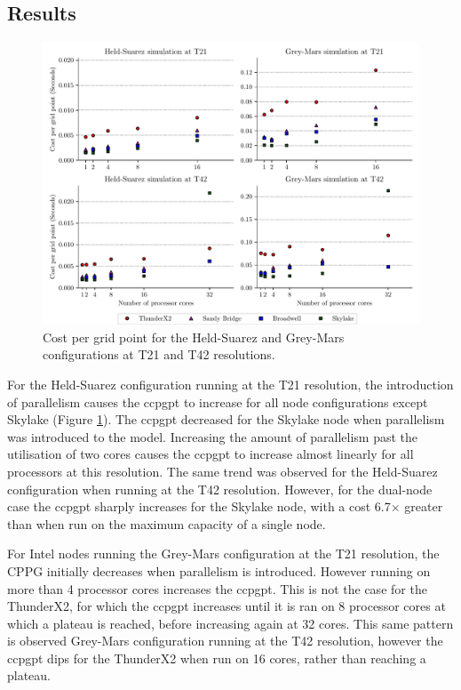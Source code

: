 \documentclass[a4paper,11pt]{report}
\begin{document}
\subsection{Results}
\begin{figure}[htbp]
\begin{center}
\includegraphics[width=1\textwidth]{img/cost-per-grid-point.pdf} 
\caption{Cost per grid point for the Held-Suarez and Grey-Mars configurations at T21 and T42 resolutions.}
\label{fig:cost-per-grid-point}
\end{center}
\end{figure}
For the Held-Suarez configuration running at the T21 resolution, the introduction of parallelism causes the \gls{ccpgpt} to increase for all node configurations except Skylake (Figure \ref{fig:cost-per-grid-point}). The \gls{ccpgpt} decreased for the Skylake node when parallelism was introduced to the model. Increasing the amount of parallelism past the utilisation of two cores causes the \gls{ccpgpt} to increase almost linearly for all processors at this resolution. The same trend was observed for the Held-Suarez configuration when running at the T42 resolution. However, for the dual-node case the \gls{ccpgpt} sharply increases for the Skylake node, with a cost 6.7$\times$ greater than when run on the maximum capacity of a single node.


\par

\par
For Intel nodes running the Grey-Mars configuration at the T21 resolution, the CPPG initially decreases when parallelism is introduced. However running on more than 4 processor cores increases the \gls{ccpgpt}. This is not the case for the ThunderX2, for which the \gls{ccpgpt} increases until it is ran on 8 processor cores at which a plateau is reached, before increasing again at 32 cores. This same pattern is observed Grey-Mars configuration running at the T42 resolution, however the \gls{ccpgpt} dips for the ThunderX2 when run on 16 cores, rather than reaching a plateau. 
\end{document}
